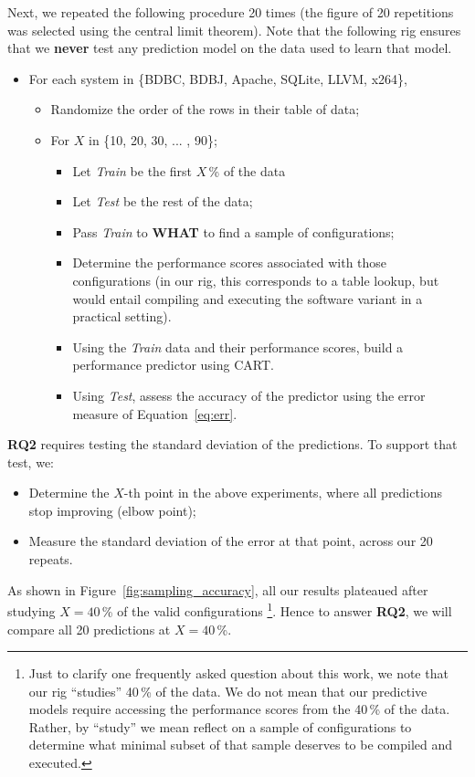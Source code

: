 \documentclass{sig-alternative}
\newcommand{\bi}{\begin{itemize}}%
\newcommand{\ei}{\end{itemize}}
\newcommand{\eq}[1]{Equation~\ref{eq:#1}}
\newcommand{\what}{{\bf WHAT }}
\begin{document}
Next, we repeated the following procedure 20 times (the figure of 20 repetitions was
selected using the central limit theorem). Note that the following rig ensures that
we \textbf{never} test any prediction model on the data used to learn that model.
\bi
\item For each system in \{BDBC, BDBJ, Apache, SQLite, LLVM, x264\},
\bi
\item Randomize the order of the rows in their table of data;
\item For $X$ in \{10, 20, 30, ... , 90\};
\bi
\item Let {\em Train} be the first $X$\,\% of the data 
\item Let {\em Test} be the rest of the data;
\item Pass {\em Train} to \what to find a sample of configurations;
\item Determine the performance scores associated with those configurations (in our rig, this corresponds to a table lookup, but would entail compiling and executing the software variant in a practical setting).
\item Using the {\em Train}  data and their performance scores, build a performance predictor using CART.
\item Using {\em Test}, assess the accuracy of the predictor using the error 
measure of \eq{err}.
\ei
\ei
\ei
{\bf RQ2} requires testing the standard deviation of the predictions. To support that test, we:
\bi
\item Determine the $X$-th point in the above experiments, where all predictions stop improving (elbow point);
\item Measure the standard deviation of the error at that point, across our 20 repeats.
\ei
As shown in Figure~\ref{fig:sampling_accuracy}, all our results plateaued after studying $X=40$\,\% of the valid configurations
 \footnote{Just to clarify one frequently asked question about this work, we note
that our rig ``studies'' 40\,\% of the data. We do not mean that our predictive models
 require accessing the performance scores from the 40\,\% of the data. Rather, by ``study'' we mean   reflect 
 on a sample of configurations to determine what minimal subset of that
sample deserves to be compiled and executed.}.
 Hence to answer {\bf RQ2}, we will compare all 20 predictions at $X=40$\,\%.
 
\end{document}
